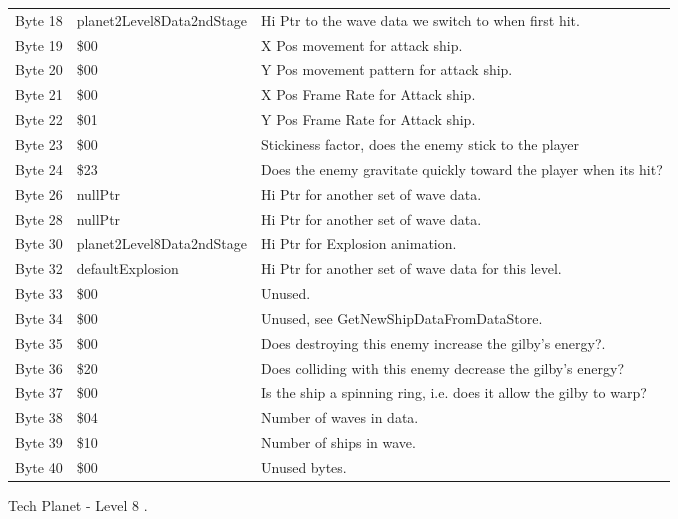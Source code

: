 \begin{figure}[H]
{\begin{adjustbox}{width=12cm}
\begin{tabular}{lll}
 Byte 18 & planet2Level8Data2ndStage & Hi Ptr to the wave data we switch to when first hit.               \\
 Byte 19 & \$00                       & X Pos movement for attack ship.                                    \\
 Byte 20 & \$00                       & Y Pos movement pattern for attack ship.                            \\
 Byte 21 & \$00                       & X Pos Frame Rate for Attack ship.                                  \\
 Byte 22 & \$01                       & Y Pos Frame Rate for Attack ship.                                  \\
 Byte 23 & \$00                       & Stickiness factor, does the enemy stick to the player              \\
 Byte 24 & \$23                       & Does the enemy gravitate quickly toward the player when its hit?   \\
 Byte 26 & nullPtr                   & Hi Ptr for another set of wave data.                               \\
 Byte 28 & nullPtr                   & Hi Ptr for another set of wave data.                               \\
 Byte 30 & planet2Level8Data2ndStage & Hi Ptr for Explosion animation.                                    \\
 Byte 32 & defaultExplosion          & Hi Ptr for another set of wave data for this level.                \\
 Byte 33 & \$00                       & Unused.                                                            \\
 Byte 34 & \$00                       & Unused, see GetNewShipDataFromDataStore.                           \\
 Byte 35 & \$00                       & Does destroying this enemy increase the gilby's energy?.           \\
 Byte 36 & \$20                       & Does colliding with this enemy decrease the gilby's energy?        \\
 Byte 37 & \$00                       & Is the ship a spinning ring, i.e. does it allow the gilby to warp? \\
 Byte 38 & \$04                       & Number of waves in data.                                           \\
 Byte 39 & \$10                       & Number of ships in wave.                                           \\
 Byte 40 & \$00                       & Unused bytes.                                                      \\
\bottomrule
\end{tabular}

  \end{adjustbox}

  }\caption*{Tech Planet - Level 8
.}
\end{figure}

